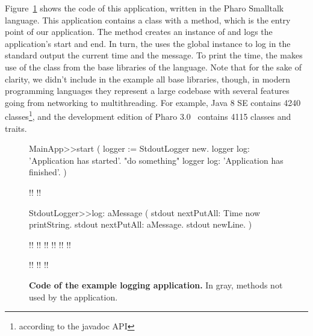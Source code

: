Figure~\ref{fig:code_example1} shows the code of this application, written in the Pharo Smalltalk language. This application contains a  class with a  method, which is the entry point of our application. The  method creates an instance of  and logs the application's start and end. In turn, the  uses the  global instance to log in the standard output the current time and the message. To print the time, the  makes use of the  class from the base libraries of the language. Note that for the sake of clarity, we didn't include in the example all base libraries, though, in modern programming languages they represent a large codebase with several features going from networking to multithreading. For example, Java 8 SE contains 4240 classes\footnote{according to the javadoc API}, and the development edition of Pharo 3.0~\cite{Blac09a} contains 4115 classes and traits.

\begin{figure}[ht]
\begin{code}
MainApp>>start (
    logger := StdoutLogger new.
    logger log: 'Application has started'.
    "do something"
    logger log: 'Application has finished'. )

!!
!!

StdoutLogger>>log: aMessage (
    stdout nextPutAll: Time now printString.
    stdout nextPutAll: aMessage.
    stdout newLine. )
    
!!
!!
!!
!!
!!
!!

!!
!!
!!
\end{code}

\caption{ \small\textbf{Code of the example logging application.} In gray, methods not used by the application.\label{fig:code_example1}}
\end{figure}

